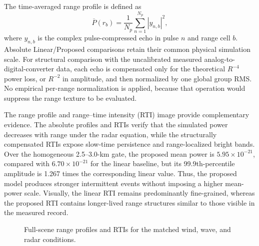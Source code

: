 The time-averaged range profile is defined as
\begin{equation}
\overline{P}(r_b)=\frac{1}{N_p}\sum_{n=1}^{N_p}|y_{n,b}|^2,
\label{eq:mean_range_profile}
\end{equation}
where $y_{n,b}$ is the complex pulse-compressed echo in pulse $n$ and range cell $b$. Absolute Linear/Proposed comparisons retain their common physical simulation scale. For structural comparison with the uncalibrated measured analog-to-digital-converter data, each echo is compensated only for the theoretical $R^{-4}$ power loss, or $R^{-2}$ in amplitude, and then normalized by one global group RMS. No empirical per-range normalization is applied, because that operation would suppress the range texture to be evaluated.

The range profile and range--time intensity (RTI) image provide complementary evidence. The absolute profiles and RTIs verify that the simulated power decreases with range under the radar equation, while the structurally compensated RTIs expose slow-time persistence and range-localized bright bands. Over the homogeneous 2.5--3.0-km gate, the proposed mean power is $5.95\times10^{-21}$, compared with $6.70\times10^{-21}$ for the linear baseline, but its 99.9th-percentile amplitude is 1.267 times the corresponding linear value. Thus, the proposed model produces stronger intermittent events without imposing a higher mean-power scale. Visually, the linear RTI remains predominantly fine-grained, whereas the proposed RTI contains longer-lived range structures similar to those visible in the measured record.

\begin{figure}[!t]
\centering
{}
\caption{Full-scene range profiles and RTIs for the matched wind, wave, and radar conditions.}
\label{fig:full_scene_range_rti}
\end{figure}

